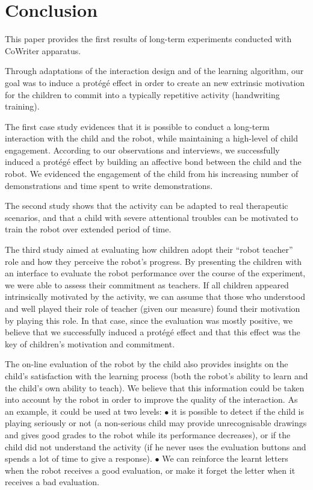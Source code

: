\documentclass[conference]{IEEEtran}
\begin{document}
\section{Conclusion}
This paper provides the first results of long-term experiments 
conducted with CoWriter apparatus.

Through adaptations of
the interaction design and of the learning algorithm, our goal was to induce a prot\'eg\'e effect in order to create an new extrinsic motivation for the children to commit into a typically repetitive activity (handwriting training).

The first case study evidences that it is possible to conduct a long-term interaction with the child and the robot, while maintaining a high-level of child engagement. According to our observations and interviews, we successfully induced a prot\'eg\'e effect by building an affective bond between the child and the robot. We evidenced the engagement of the child from his increasing number of demonstrations and time spent to write demonstrations.

The second study shows that the activity can be adapted to real therapeutic scenarios, and that a child with severe attentional troubles can be motivated to train the robot over extended period of time.

The third study aimed at evaluating how children adopt their ``robot teacher'' role and how they perceive the robot's progress. By presenting the children with an interface to evaluate the robot performance over the course of the experiment, we were able to assess their commitment as teachers. If all children appeared intrinsically motivated by the activity, we can assume that those who understood and well played their role of teacher (given our measure) found their motivation by playing this role. In that case, since the evaluation was mostly positive, we believe that we successfully induced a prot\'eg\'e effect and that this effect was the key of children's motivation and commitment. 


The on-line evaluation of the robot by the child also provides insights on the child's satisfaction with the
learning process (both the robot's ability to learn and the child's own
ability to teach). We believe that this information could be taken into account by
the robot in order to improve the quality of the interaction. As an example, it
could be used at two levels: $\bullet$ it is possible to detect if the child is playing
seriously or not (a non-serious child may provide unrecognisable drawings and gives good grades to
the robot while its performance decreases), or if the child did not understand the
activity (if he never uses the evaluation buttons and spends a lot of time to
give a response). $\bullet$ We can reinforce the learnt letters when the robot
receives a good evaluation, or make it forget the letter when it
receives a bad evaluation.
\end{document}
